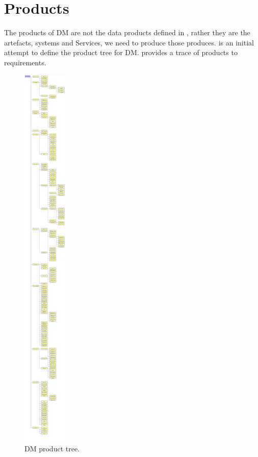 \section{Products \label{sect:products}}

The products of DM are not the data products defined in , rather they are the artefacts, systems and Services,  we need to produce those produces.  is an initial attempt to define the product tree for DM.  provides a trace of products to requirements. 

\begin{figure}[htbp]
	\begin{center}
		 \includegraphics[height=19cm]{ProductTree}
		 \caption{DM product tree. \label{fig:prods}}
	 \end{center}
 \end{figure}


